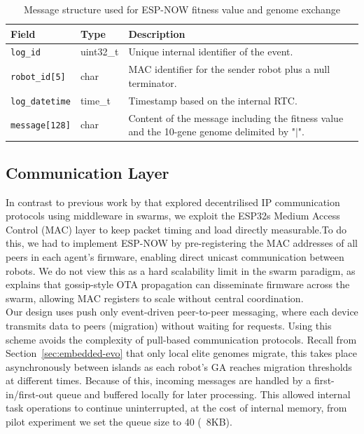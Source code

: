 \documentclass[conference]{IEEEtran}
\begin{document}
\begin{table}[H]
  \centering
  \caption{Message structure used for ESP-NOW fitness value and genome exchange}
  \label{tab:out_message}
  \begin{tabular}{l l p{4cm}}
    \toprule
    \textbf{Field} & \textbf{Type} & \textbf{Description} \\
    \midrule
    \texttt{log\_id} & uint32\_t & Unique internal identifier of the event.\\
    \texttt{robot\_id[5]} & char & MAC identifier for the sender robot plus a null terminator.\\
    \texttt{log\_datetime} & time\_t & Timestamp based on the internal RTC.\\
    \texttt{message[128]} & char & Content of the message including the fitness value and the 10-gene genome delimited by "$|$".\\
    \bottomrule
  \end{tabular}
\end{table}

\subsection{Communication Layer}\label{sec:comm-layer}

In contrast to previous work by \cite{rabbah_real_2021} that explored decentrilised IP communication protocols using middleware in swarms, we exploit the ESP32s Medium Access Control (MAC) layer to keep  packet timing and load directly measurable.To do this, we had to implement ESP-NOW by pre-registering the MAC addresses of all peers in each agent's firmware, enabling direct unicast communication between robots. We do not view this as a hard scalability limit in the swarm paradigm, as \cite{varadharajan_over--air_2018} explains that gossip-style OTA propagation can disseminate firmware across the swarm, allowing MAC registers to scale without central coordination. \\

Our design uses push only event-driven peer-to-peer messaging, where each device transmits data to peers (migration) without waiting for requests. Using this scheme avoids the complexity of pull-based communication protocols. Recall from Section~\ref{sec:embedded-evo} that only local elite genomes migrate, this takes place asynchronously between islands as each robot's GA reaches migration thresholds at different times. Because of this, incoming messages are handled by a first-in/first-out queue and buffered locally for later processing. This allowed internal task operations to continue uninterrupted, at the cost of internal memory, from pilot experiment we set the queue size to 40 (~8KB). \\
\end{document}
